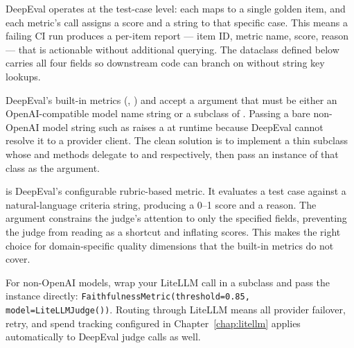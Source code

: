 DeepEval operates at the test-case level: each  maps to a
single golden item, and each metric's  call assigns a score
and a  string to that specific case.  This means a failing CI
run produces a per-item report --- item ID, metric name, score, reason ---
that is actionable without additional querying.  The 
dataclass defined below carries all four fields so downstream code can branch
on  without string key lookups.

\begin{notebox}
DeepEval's built-in metrics (,
) and  accept a 
argument that must be either an OpenAI-compatible model name string or a
subclass of .  Passing a bare non-OpenAI model string
such as  raises a  at runtime
because DeepEval cannot resolve it to a provider client.  The clean solution
is to implement a thin  subclass whose
 and  methods delegate to
 and  respectively, then
pass an instance of that class as the  argument.
\end{notebox}

 is DeepEval's configurable rubric-based metric.  It evaluates
a test case against a natural-language criteria string, producing a 0--1
score and a reason.  The  argument constrains the
judge's attention to only the specified  fields,
preventing the judge from reading  as a shortcut
and inflating scores.  This makes  the right choice for
domain-specific quality dimensions that the built-in metrics do not cover.

\begin{tipbox}
For non-OpenAI models, wrap your LiteLLM call in a 
subclass and pass the instance directly:
\texttt{FaithfulnessMetric(threshold=0.85, model=LiteLLMJudge())}.
Routing through LiteLLM means all provider failover, retry, and spend
tracking configured in Chapter~\ref{chap:litellm} applies automatically
to DeepEval judge calls as well.
\end{tipbox}

